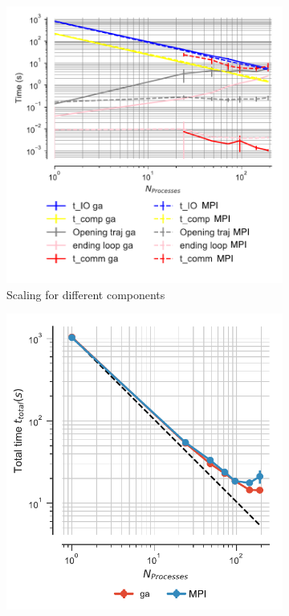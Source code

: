  \begin{figure}[!htb]
\centering
\begin{subfigure}{.3\textwidth}
  \includegraphics[width=\linewidth]{figures/Comparison_IO_compute_scaling_traj_splitting-chain-reader_edited.pdf}
  \captionsetup{format=hang}
  \caption{Scaling for different components}
  \label{fig:MPIscaling-chain-reader}
\end{subfigure}
\hfill
\begin{subfigure}{.3\textwidth}
  \includegraphics[width=\linewidth]{figures/Comparison_tot_time_traj_splitting-chain-reader_edited.pdf}

\end{subfigure}
\end{figure}
